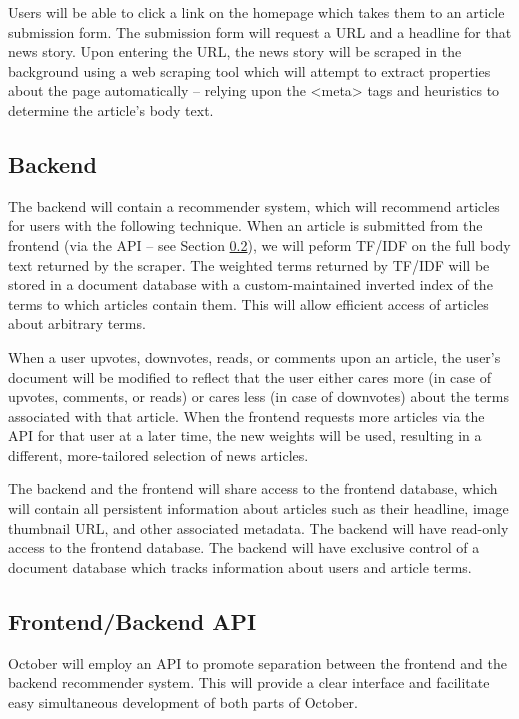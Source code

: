 \documentclass[11pt,letterpaper]{article}
\begin{document}
Users will be able to click a link on the homepage which takes them to an article submission form.
The submission form will request a URL and a headline for that news story.
Upon entering the URL, the news story will be scraped in the background using a web scraping tool which will attempt to extract properties about the page automatically -- relying upon the <meta> tags and heuristics to determine the article's body text.

\subsection{Backend}
The backend will contain a recommender system, which will recommend articles for users with the following technique.
When an article is submitted from the frontend (via the API -- see Section \ref{sec:api}), we will peform TF/IDF\cite{tfidf} on the full body text returned by the scraper.
The weighted terms returned by TF/IDF will be stored in a document database with a custom-maintained inverted index of the terms to which articles contain them.
This will allow efficient access of articles about arbitrary terms.

When a user upvotes, downvotes, reads, or comments upon an article, the user's document will be modified to reflect that the user either cares more (in case of upvotes, comments, or reads) or cares less (in case of downvotes) about the terms associated with that article.
When the frontend requests more articles via the API for that user at a later time, the new weights will be used, resulting in a different, more-tailored selection of news articles.

The backend and the frontend will share access to the frontend database, which will contain all persistent information about articles such as their headline, image thumbnail URL, and other associated metadata.
The backend will have read-only access to the frontend database.
The backend will have exclusive control of a document database which tracks information about users and article terms.

\subsection{Frontend/Backend API}
\label{sec:api}
October will employ an API to promote separation between the frontend and the backend recommender system.
This will provide a clear interface and facilitate easy simultaneous development of both parts of October.
\end{document}
